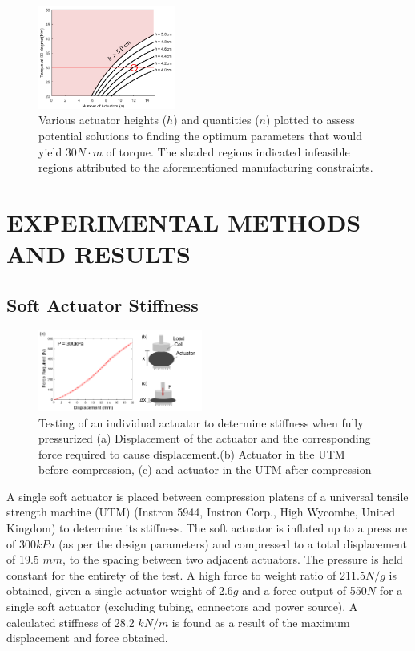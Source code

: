 \documentclass[letterpaper, 10 pt, conference]{ieeeconf}  %
\begin{document}
\begin{figure}[t!]
\centering
\includegraphics[width=0.4\textwidth]{dif_R_n.PNG}
\caption{Various actuator heights ($h$) and quantities ($n$) plotted to assess potential solutions to finding the optimum parameters that would yield 30$N{\cdot}m$ of torque.  The shaded regions indicated infeasible regions attributed to the aforementioned manufacturing constraints.}
\label{fig:dif_R_n}
\vspace{-1em}
\end{figure}



\section{EXPERIMENTAL METHODS AND RESULTS}

\subsection{Soft Actuator Stiffness}
\begin{figure}[t!]
\centering
\includegraphics[width=0.48\textwidth]{stiiffnesstest.PNG}
\caption{Testing of an individual actuator to determine stiffness when fully pressurized (a) Displacement of the actuator and the corresponding force required to cause displacement.(b) Actuator in the UTM before compression, (c) and actuator in the UTM after compression}
\label{fig:stifftest}
\vspace{-1.5em}
\end{figure}

A single soft actuator is placed between compression platens of a universal tensile strength machine (UTM) (Instron 5944, Instron Corp., High Wycombe, United Kingdom) to determine its  stiffness.  The soft actuator is inflated up to a pressure of 300$kPa$ (as per the design parameters) and compressed to a total displacement of 19.5 $mm$, to the spacing between two adjacent actuators. The pressure is  held constant for the entirety of the test. A high force to weight ratio of 211.5${N}/{g}$ is obtained, given a single actuator weight of 2.6$g$ and a force output of 550$N$ for a single soft actuator (excluding tubing, connectors and power source).  A calculated stiffness of 28.2 $kN/m$ is found as a result of the maximum displacement and force obtained.
\end{document}
